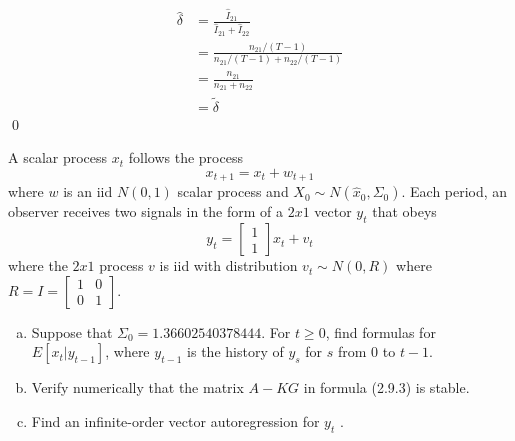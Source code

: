 \documentclass{homework}
\begin{document}
\begin{homeworkProblem}
{\begin{enumerate}[a.]
        \begin{align*}
          \hat{\delta} &= \frac{\hat{I}_{21}}{\hat{I}_{21}+\hat{I}_{22}} \\
            &= \frac{n_{21} / (T - 1)}{n_{21} / (T - 1) + n_{22} / (T - 1)} \\
            &= \frac{n_{21}}{n_{21} + n_{22}} \\
            &= \tilde{\delta}
        \end{align*}
        \qed
    \end{enumerate}

  }
\end{homeworkProblem}

\begin{homeworkProblem}

  A scalar process $x_t$ follows the process
  $$ x_{t+1} = x_t + w_{t+1} $$
  where $w$ is an iid $N(0, 1)$ scalar process and $X_0 \sim N(\hat{x}_0, \Sigma_0)$. Each period, an observer receives two signals in the form of a $2 x 1$ vector $y_t$ that obeys
  $$ y_t = \left[\begin{smallmatrix} 1 \\ 1 \end{smallmatrix}\right] x_t + v_t $$
  where the $2 x 1$ process $v$ is iid with distribution $v_t \sim N(0, R)$ where $R = I = \left[\begin{smallmatrix} 1 & 0 \\ 0 & 1 \end{smallmatrix}\right]$.

  \begin{enumerate}[a.]
    \item Suppose that $\Sigma_0 = 1.36602540378444$. For $t \ge 0$, find formulas for $E[x_t|y_{t-1}]$, where $y_{t-1}$ is the history of $y_s$ for $s$ from $0$ to $t - 1$.
    \item Verify numerically that the matrix $A - KG$ in formula (2.9.3) is stable.
    \item Find an infinite-order vector autoregression for $y_t$ .
  \end{enumerate}

  \vspace{.2in}

\end{homeworkProblem}
\end{document}
